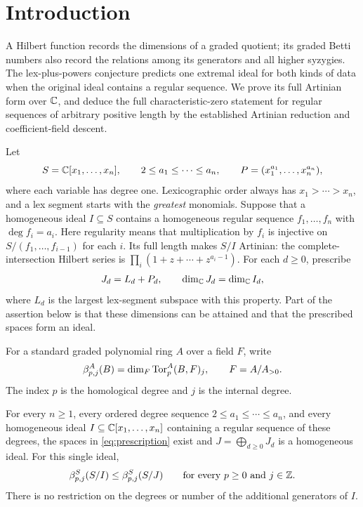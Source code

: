 \section{Introduction}\label{sec:introduction}

A Hilbert function records the dimensions of a graded quotient; its graded
Betti numbers also record the relations among its generators and all higher
syzygies. The lex-plus-powers conjecture predicts one extremal ideal for
both kinds of data when the original ideal contains a regular sequence.
We prove its full Artinian form over \(\mathbb C\), and deduce the full
characteristic-zero statement for regular sequences of arbitrary positive
length by the established Artinian reduction and coefficient-field descent.

Let
\[
 S=\mathbb C[x_1,\ldots,x_n],\qquad
 2\le a_1\le\cdots\le a_n,\qquad
 P=(x_1^{a_1},\ldots,x_n^{a_n}),
\]
where each variable has degree one. Lexicographic order always has
\(x_1>\cdots>x_n\), and a lex segment starts with the \emph{greatest}
monomials. Suppose that a homogeneous ideal \(I\subseteq S\) contains a
homogeneous regular sequence \(f_1,\ldots,f_n\) with \(\deg f_i=a_i\).
Here regularity means that multiplication by \(f_i\) is injective on
\(S/(f_1,\ldots,f_{i-1})\) for each \(i\). Its full length makes
\(S/I\) Artinian: the complete-intersection Hilbert series is
\(\prod_i(1+z+\cdots+z^{a_i-1})\).
For each \(d\ge0\), prescribe
\begin{equation}
 J_d=L_d+P_d,\qquad \dim_\mathbb C J_d=\dim_\mathbb C I_d,
 \label{eq:prescription}
\end{equation}
where \(L_d\) is the largest lex-segment subspace with this property.
Part of the assertion below is that these dimensions can be attained
and that the prescribed spaces form an ideal.

For a standard graded polynomial ring \(A\) over a field \(F\), write
\[
 \beta^A_{p,j}(B)=\dim_F\operatorname{Tor}^A_p(B,F)_j,
 \qquad F=A/A_{>0}.
\]
The index \(p\) is the homological degree and \(j\) is the internal degree.

\begin{theorem}\label{thm:main}
For every \(n\ge1\), every ordered degree sequence
\(2\le a_1\le\cdots\le a_n\), and every homogeneous ideal
\(I\subseteq\mathbb C[x_1,\ldots,x_n]\) containing a regular sequence of these
degrees, the spaces in \eqref{eq:prescription} exist and
\(J=\bigoplus_{d\ge0}J_d\) is a homogeneous ideal. For this single ideal,
\[
 \beta^S_{p,j}(S/I)\le\beta^S_{p,j}(S/J)
 \qquad\text{for every \(p\ge0\) and \(j\in\mathbb Z\)}.
\]
There is no restriction on the degrees or number of the additional
generators of \(I\).
\end{theorem}

